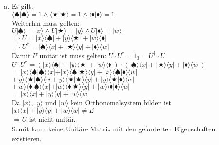 \documentclass[a4paper]{scrartcl}
\begin{document}
\begin{enumerate}[a)]
\item 
Es gilt:\\
$\langle \spadesuit | \spadesuit\rangle =1 \wedge \langle \bigstar | \bigstar \rangle=1 \wedge \langle \blacklozenge | \blacklozenge\rangle =1$\\
Weiterhin muss gelten:\\
$U|\spadesuit\rangle=|x\rangle \wedge U|\bigstar\rangle=|y\rangle \wedge U|\blacklozenge\rangle=|w\rangle$\\
$\Rightarrow U=|x\rangle\langle\spadesuit|+|y\rangle\langle\bigstar|+|w\rangle\langle\blacklozenge|$\\
$\Rightarrow U^\dagger= |\spadesuit\rangle\langle x|+|\bigstar\rangle\langle y|+|\blacklozenge\rangle\langle w|$\\
Damit $U$ unitär ist muss gelten: $U\cdot U^\dagger=1_3=U^\dagger\cdot U$\\
$U\cdot U^\dagger = (|x\rangle\langle\spadesuit|+|y\rangle\langle\bigstar|+|w\rangle\langle\blacklozenge|)\cdot(|\spadesuit\rangle\langle x|+|\bigstar\rangle\langle y|+|\blacklozenge\rangle\langle w|)$\\
$= |x\rangle\langle\spadesuit|\spadesuit\rangle\langle x|+|x\rangle\langle\spadesuit|\bigstar\rangle\langle y|+|x\rangle\langle\spadesuit|\blacklozenge\rangle\langle w|$\\
$+|y\rangle\langle\bigstar|\spadesuit\rangle\langle x|+|y\rangle\langle\bigstar|\bigstar\rangle\langle y|+|y\rangle\langle\bigstar|\blacklozenge\rangle\langle w|$\\
$+|w\rangle\langle\blacklozenge|\spadesuit\rangle\langle x|+|w\rangle\langle\blacklozenge|\bigstar\rangle\langle y|+|w\rangle\langle\blacklozenge|\blacklozenge\rangle\langle w|$\\
$= |x\rangle\langle x|+|y\rangle\langle y|+|w\rangle\langle w|$\\
Da $|x\rangle$, $|y\rangle$ und $|w\rangle$ kein Orthonomalsystem bilden ist $|x\rangle\langle x|+|y\rangle\langle y|+|w\rangle\langle w|\neq E$\\
$\Rightarrow U$ ist nicht unitär.\\
Somit kann keine Unitäre Matrix mit den geforderten Eigenschaften existieren.


\end{enumerate}
\end{document}
